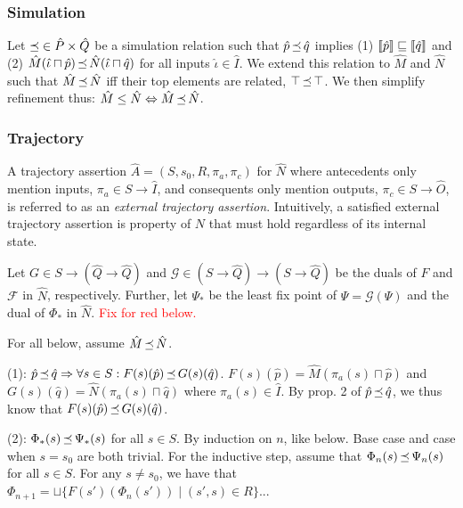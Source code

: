 \subsubsection{Simulation} Let $\operatorname{\preceq} \in \hat P \times \hat Q$ be a simulation relation such that $\hat p \operatorname{\preceq} \hat q$ implies (1) $\llbracket\hat p\rrbracket \sqsubseteq \llbracket\hat q\rrbracket$ and (2) $\hat M(\hat \iota \sqcap \hat p) \operatorname{\preceq} \hat N(\hat \iota \sqcap \hat q)$ for all inputs $\hat \iota \in \hat I$. We extend this relation to $\hat M$ and $\hat N$ such that $\hat M \operatorname{\preceq} \hat N$ iff their top elements are related, $\top \operatorname{\preceq} \top$. We then simplify refinement thus: $\hat M \leq \hat N \Leftrightarrow \hat M \operatorname{\preceq} \hat N$.


\subsubsection{Trajectory} A trajectory assertion $\hat A = (S,s_{0},R,\pi_{a},\pi_{c})$ for $\hat N$ where antecedents only mention inputs, $\pi_{a} \in S \rightarrow \hat I$, and consequents only mention outputs, $\pi_{c} \in S \rightarrow \hat O$, is referred to as an \textit{external trajectory assertion}. Intuitively, a satisfied external trajectory assertion is property of $N$ that must hold regardless of its internal state.

Let $G \in S \rightarrow (\hat Q \rightarrow \hat Q)$ and $\mathcal{G} \in (S \rightarrow \hat Q) \rightarrow (S \rightarrow \hat Q)$ be the duals of $F$ and $\mathcal{F}$ in $\hat N$, respectively. Further, let $\Psi_{*}$ be the least fix point of $\Psi = \mathcal{G}(\Psi)$ and the dual of $\Phi_{*}$ in $\hat N$. \textcolor{red}{Fix for red below.}

For all below, assume $\hat M \operatorname{\preceq} \hat N$.

(1): $\hat p \operatorname{\preceq} \hat q \Rightarrow \forall s \in S : F(s)(\hat p) \operatorname{\preceq} G(s)(\hat q)$. $F(s)(\hat p) = \hat M(\pi_{a}(s) \sqcap \hat p)$ and $G(s)(\hat q) = \hat N(\pi_{a}(s) \sqcap \hat q)$ where $\pi_{a}(s) \in \hat I$. By prop. 2 of $\hat p \operatorname{\preceq} \hat q$, we thus know that $F(s)(\hat p) \operatorname{\preceq} G(s)(\hat q)$.

(2): $\Phi_{*}(s) \operatorname{\preceq} \Psi_{*}(s)$ for all $s \in S$. By induction on $n$, like below. Base case and case when $s = s_{0}$ are both trivial. For the inductive step, assume that $\Phi_{n}(s) \operatorname{\preceq} \Psi_{n}(s)$ for all $s \in S$. For any $s \neq s_{0}$, we have that $\Phi_{n+1} = \sqcup \{ F(s')(\Phi_{n}(s')) \mid (s',s) \in R \}$...

